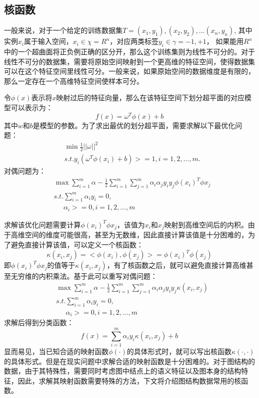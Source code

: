 \subsection{核函数}
\par 一般来说，对于一个给定的训练数据集$T={(x_1, y_1), (x_2, y_2), ...(x_n, y_n)}$, 其中实例$x_i$属于输入空间，$x_i\in \chi=R^n$，对应两类标签$y_i\in \gamma={-1, +1}$， 如果能用$R^n$中的一个超曲面将正负例正确的区分开，那么这个训练集则为线性不可分的。对于线性不可分的数据集，需要将原始空间映射到一个更高维的特征空间，使得数据集可以在这个特征空间里线性可分。一般来说，如果原始空间的数据维度是有限的，那么一定存在一个高维特征空间使样本可分。
\par 令$\phi(x)$表示将$x$映射过后的特征向量，那么在该特征空间下划分超平面的对应模型可以表示为：
$$f(x)=\omega^T\phi(x)+b$$
其中$w$和$b$是模型的参数。为了求出最优的划分超平面，需要求解以下最优化问题：
\begin{align}
&\min \frac{1}{2} ||\omega||^2 \\
&s.t. y_i(\omega^T\phi(x_i)+b)>=1, i=1,2,...,m.
\end{align}
对偶问题为：
\begin{align}
&\max \sum_{i=1}^{m} \alpha - \frac{1}{2}\sum_{i=1}^{m}\sum_{j=1}^{m} \alpha_i\alpha_jy_iy_j\phi(x_i)^T\phi{x_j}\\
&s.t. \sum_{i=1}^m \alpha_i y_i = 0,\\
&\phantom {s.t.}\alpha_i >=0,  i=1,2,...,m
\end{align}
\par 	求解该优化问题需要计算$\phi(x_i)^T\phi{x_j}$，该值为$x_i$和$x_j$映射到高维空间后的内积。由于高维空间的维度可能很高，甚至为无数维，因此直接计算该值是十分困难的，为了避免直接计算该值，可以定义一个核函数：
\begin{equation}
\kappa(x_i, x_j) = <\phi(x_i), \phi(x_j)> = \phi(x_i)^T\phi(x_j)
\end{equation}
即$\phi(x_i)^T\phi{x_j}$的值等于$\kappa(x_i, x_j) $，有了核函数之后，就可以避免直接计算高维甚至无穷维的内积乘法。基于此可以重写对偶问题：
\begin{align}
&\max \sum_{i=1}^{m} \alpha - \frac{1}{2}\sum_{i=1}^{m}\sum_{j=1}^{m} \alpha_i\alpha_jy_iy_j\kappa(x_i, x_j) \\
&s.t. \sum_{i=1}^m \alpha_i y_i = 0,\\
&\phantom {s.t.}\alpha_i >=0,  i=1,2,...,m
\end{align}
求解后得到分类函数：
\begin{equation}
f(x)=\sum_{i=1}^m \alpha_iy_i \kappa(x_i, x_j) +b
\end{equation}
显而易见，当已知合适的映射函数$\phi(\cdot)$的具体形式时，就可以写出核函数$\kappa(\cdot, \cdot)$的具体形式。但是在现实问题中求解合适的映射函数是十分困难的。对于图结构的数据，由于其特殊性，需要同时考虑图中结点上的语义特征以及图本身的结构特征，因此，求解其映射函数需要特殊的方法，下文将介绍图结构数据常用的核函数。
